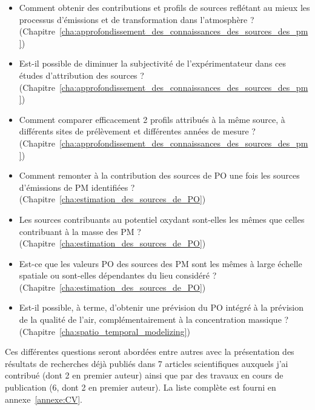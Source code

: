 \begin{itemize}
    \item Comment obtenir des contributions et profils de sources reflétant au mieux les
        processus d'émissions et de transformation dans l'atmosphère ?
        (Chapitre~\ref{cha:approfondissement_des_connaissances_des_sources_des_pm})
    \item Est-il possible de diminuer la subjectivité de l'expérimentateur dans ces
        études d'attribution des sources ?
        (Chapitre~\ref{cha:approfondissement_des_connaissances_des_sources_des_pm})
    \item Comment comparer efficacement 2 profils attribués à la même source, à
        différents sites de prélèvement et différentes années de mesure ?
        (Chapitre~\ref{cha:approfondissement_des_connaissances_des_sources_des_pm})
    \item Comment remonter à la contribution des sources de PO une fois les sources
        d'émissions de PM identifiées ?
        (Chapitre~\ref{cha:estimation_des_sources_de_PO})
    \item Les sources contribuants au potentiel oxydant sont-elles les mêmes que celles
        contribuant à la masse des PM ?
        (Chapitre~\ref{cha:estimation_des_sources_de_PO})
    \item Est-ce que les valeurs PO des sources des PM sont les mêmes à large échelle spatiale ou
        sont-elles dépendantes du lieu considéré ?
        (Chapitre~\ref{cha:estimation_des_sources_de_PO})
    \item Est-il possible, à terme, d'obtenir une prévision du PO intégré à la prévision
        de la qualité de l'air, complémentairement à la concentration massique ?
        (Chapitre~\ref{cha:spatio_temporal_modelizing})
\end{itemize}

Ces différentes questions seront abordées entre autres avec la présentation des résultats de
recherches déjà publiés dans 7 articles scientifiques auxquels j'ai contribué (dont 2 
en premier auteur) ainsi que par des travaux en cours de publication (6, dont 2 en premier auteur).
La liste complète est fourni en annexe~\ref{annexe:CV}.
